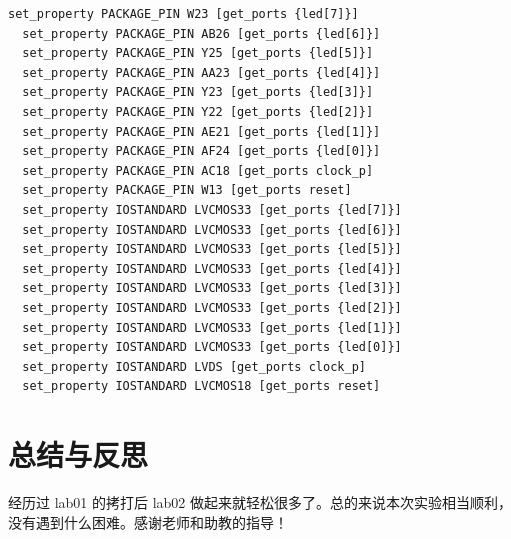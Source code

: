 \documentclass{progartcn}
\begin{document}
\begin{lstlisting}[caption={lab02\_xdc.xdc},label={cd:5}]
  set_property PACKAGE_PIN W23 [get_ports {led[7]}]
  set_property PACKAGE_PIN AB26 [get_ports {led[6]}]
  set_property PACKAGE_PIN Y25 [get_ports {led[5]}]
  set_property PACKAGE_PIN AA23 [get_ports {led[4]}]
  set_property PACKAGE_PIN Y23 [get_ports {led[3]}]
  set_property PACKAGE_PIN Y22 [get_ports {led[2]}]
  set_property PACKAGE_PIN AE21 [get_ports {led[1]}]
  set_property PACKAGE_PIN AF24 [get_ports {led[0]}]
  set_property PACKAGE_PIN AC18 [get_ports clock_p]
  set_property PACKAGE_PIN W13 [get_ports reset]
  set_property IOSTANDARD LVCMOS33 [get_ports {led[7]}]
  set_property IOSTANDARD LVCMOS33 [get_ports {led[6]}]
  set_property IOSTANDARD LVCMOS33 [get_ports {led[5]}]
  set_property IOSTANDARD LVCMOS33 [get_ports {led[4]}]
  set_property IOSTANDARD LVCMOS33 [get_ports {led[3]}]
  set_property IOSTANDARD LVCMOS33 [get_ports {led[2]}]
  set_property IOSTANDARD LVCMOS33 [get_ports {led[1]}]
  set_property IOSTANDARD LVCMOS33 [get_ports {led[0]}]
  set_property IOSTANDARD LVDS [get_ports clock_p]
  set_property IOSTANDARD LVCMOS18 [get_ports reset]
\end{lstlisting}

\section{总结与反思}

经历过 lab01 的拷打后 lab02 做起来就轻松很多了。总的来说本次实验相当顺利，没有遇到什么困难。感谢老师和助教的指导！
\end{document}
